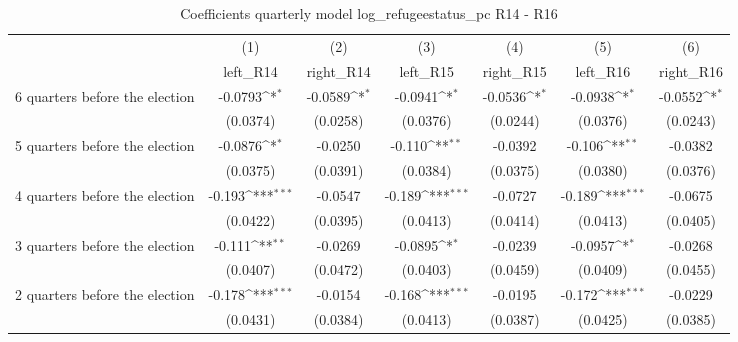 \begin{table}[htbp]\centering
\def\sym#1{\ifmmode^{#1}\else\(^{#1}\)\fi}
\caption{Coefficients quarterly model log\_refugeestatus\_pc R14 - R16}
\begin{tabular}{l*{6}{c}}
\hline\hline
                    &\multicolumn{1}{c}{(1)}&\multicolumn{1}{c}{(2)}&\multicolumn{1}{c}{(3)}&\multicolumn{1}{c}{(4)}&\multicolumn{1}{c}{(5)}&\multicolumn{1}{c}{(6)}\\
                    &\multicolumn{1}{c}{left\_R14}&\multicolumn{1}{c}{right\_R14}&\multicolumn{1}{c}{left\_R15}&\multicolumn{1}{c}{right\_R15}&\multicolumn{1}{c}{left\_R16}&\multicolumn{1}{c}{right\_R16}\\
\hline
 6 quarters before the election&     -0.0793\sym{*}  &     -0.0589\sym{*}  &     -0.0941\sym{*}  &     -0.0536\sym{*}  &     -0.0938\sym{*}  &     -0.0552\sym{*}  \\
                    &    (0.0374)         &    (0.0258)         &    (0.0376)         &    (0.0244)         &    (0.0376)         &    (0.0243)         \\
[1em]
 5 quarters before the election&     -0.0876\sym{*}  &     -0.0250         &      -0.110\sym{**} &     -0.0392         &      -0.106\sym{**} &     -0.0382         \\
                    &    (0.0375)         &    (0.0391)         &    (0.0384)         &    (0.0375)         &    (0.0380)         &    (0.0376)         \\
[1em]
 4 quarters before the election&      -0.193\sym{***}&     -0.0547         &      -0.189\sym{***}&     -0.0727         &      -0.189\sym{***}&     -0.0675         \\
                    &    (0.0422)         &    (0.0395)         &    (0.0413)         &    (0.0414)         &    (0.0413)         &    (0.0405)         \\
[1em]
 3 quarters before the election&      -0.111\sym{**} &     -0.0269         &     -0.0895\sym{*}  &     -0.0239         &     -0.0957\sym{*}  &     -0.0268         \\
                    &    (0.0407)         &    (0.0472)         &    (0.0403)         &    (0.0459)         &    (0.0409)         &    (0.0455)         \\
[1em]
 2 quarters before the election&      -0.178\sym{***}&     -0.0154         &      -0.168\sym{***}&     -0.0195         &      -0.172\sym{***}&     -0.0229         \\
                    &    (0.0431)         &    (0.0384)         &    (0.0413)         &    (0.0387)         &    (0.0425)         &    (0.0385)         \\

\end{tabular}
\end{table}
